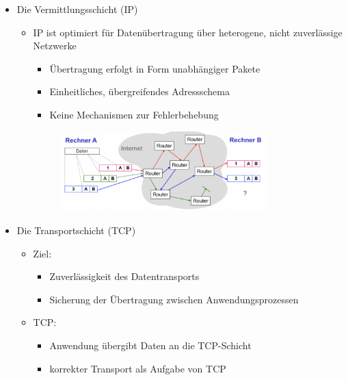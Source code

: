 \documentclass{scrreprt}
\begin{document}
\begin{itemize}
\begin{itemize}
	\end{itemize}
	\item Die Vermittlungsschicht (IP)
	\begin{itemize}
		\item IP ist optimiert für Datenübertragung über heterogene, nicht zuverlässige Netzwerke
		\begin{itemize}
			\item Übertragung erfolgt in Form unabhängiger Pakete
			\item Einheitliches, übergreifendes Adressschema
			\item Keine Mechanismen zur Fehlerbehebung
		\end{itemize}
		\begin{figure}[h]
			\includegraphics[width=0.80\textwidth]{"graphics/IP"}
			\centering
		\end{figure}
	\end{itemize}
	\item Die Transportschicht (TCP)
	\begin{itemize}
		\item Ziel:
		\begin{itemize}
			\item Zuverlässigkeit des Datentransports
			\item Sicherung der Übertragung zwischen Anwendungsprozessen
		\end{itemize}
		\item TCP:
		\begin{itemize}
			\item Anwendung übergibt Daten an die TCP-Schicht
			\item korrekter Transport als Aufgabe von TCP
		\end{itemize}
	\end{itemize}
\end{itemize}
\end{document}
